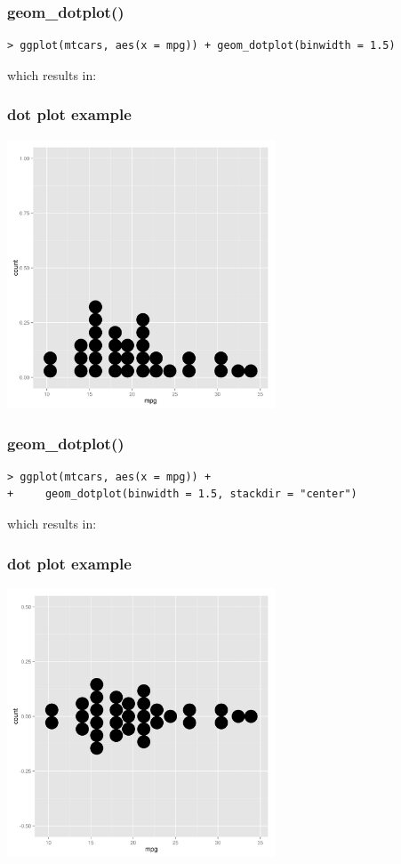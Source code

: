 \documentclass[xcolor={table}]{beamer}
\begin{document}
\begin{frame}[fragile]\frametitle{geom\_dotplot()}
\small
\begin{verbatim}
> ggplot(mtcars, aes(x = mpg)) + geom_dotplot(binwidth = 1.5)
\end{verbatim}
which results in:
\end{frame}

\begin{frame}\frametitle{dot plot example}
  \begin{center}
    \includegraphics[width=8cm]{dotplot2.png}
  \end{center}
\end{frame}



\begin{frame}[fragile]\frametitle{geom\_dotplot()}
\small
\begin{verbatim}
> ggplot(mtcars, aes(x = mpg)) +
+     geom_dotplot(binwidth = 1.5, stackdir = "center")
\end{verbatim}
which results in:
\end{frame}

\begin{frame}\frametitle{dot plot example}
  \begin{center}
    \includegraphics[width=8cm]{dotplot4.png}
  \end{center}
\end{frame}
\end{document}
